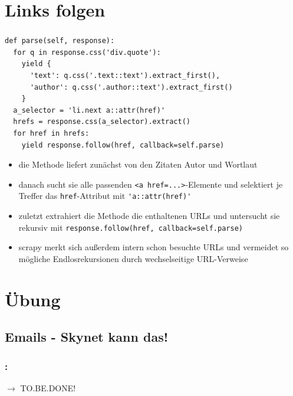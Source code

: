 \documentclass{beamer}
\begin{document}
\section{Links folgen}
\begin{frame}
	\frametitle{\insertsection{}}
	\begin{lstlisting}
def parse(self, response):
  for q in response.css('div.quote'):
    yield {
      'text': q.css('.text::text').extract_first(),
      'author': q.css('.author::text').extract_first()
    }
  a_selector = 'li.next a::attr(href)'
  hrefs = response.css(a_selector).extract()  
  for href in hrefs:    
    yield response.follow(href, callback=self.parse)
	\end{lstlisting}
	\begin{itemize}
		\item die Methode liefert zunächst von den Zitaten Autor und Wortlaut
		\item danach sucht sie alle passenden \lstinline|<a href=...>|-Elemente und selektiert je Treffer das \lstinline|href|-Attribut mit \lstinline|'a::attr(href)'| 
		
		\framebreak
		
		\item zuletzt extrahiert die Methode die enthaltenen URLs und untersucht sie rekursiv mit \lstinline|response.follow(href, callback=self.parse)| 
		\item scrapy merkt sich außerdem intern schon besuchte URLs und vermeidet so mögliche Endlosrekursionen durch wechselseitige URL-Verweise
	\end{itemize}
\end{frame}


\section{Übung}

\subsection{Emails - Skynet kann das!}
\begin{frame}
	\frametitle{\insertsection{}: \insertsubsection{}}
	$\rightarrow$ TO.BE.DONE!
\end{frame}

\framebreak
\end{document}
